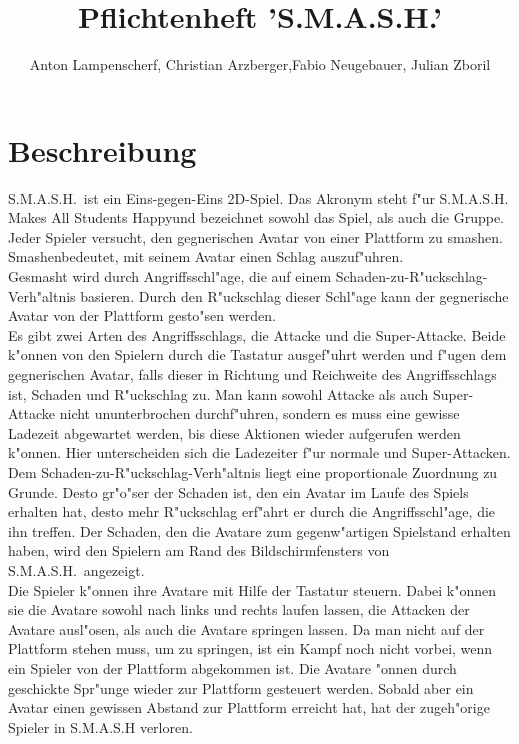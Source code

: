 \documentclass[a4paper, 11pt]{article}
\title{Pflichtenheft 'S.M.A.S.H.'}
\author{Anton Lampenscherf, Christian Arzberger,\newline  Fabio Neugebauer, Julian Zboril}
\begin{document}
    \maketitle

    \section{Beschreibung}\label{sec:beschreibung}
    S.M.A.S.H.\ ist ein Eins-gegen-Eins 2D-Spiel.
    Das Akronym steht f"ur \newline\glqq S.M.A.S.H. Makes All Students Happy\grqq\space und bezeichnet sowohl das Spiel, als auch die Gruppe.
    Jeder Spieler versucht, den gegnerischen Avatar von einer Plattform zu \glqq smashen\grqq. \glqq Smashen\grqq bedeutet, mit seinem Avatar einen Schlag auszuf"uhren.\\

    \noindent
    Gesmasht wird durch Angriffsschl"age, die auf einem Schaden-zu-R"uckschlag-Verh"altnis basieren.
    Durch den R"uckschlag dieser Schl"age kann der gegnerische Avatar von der Plattform gesto"sen werden.\\

    \noindent
    Es gibt zwei Arten des Angriffsschlags, die Attacke und die Super-Attacke.
    Beide k"onnen von den Spielern durch die Tastatur ausgef"uhrt werden und f"ugen dem gegnerischen Avatar, falls dieser in Richtung und Reichweite des Angriffsschlags ist, Schaden und R"uckschlag zu.
    Man kann sowohl Attacke als auch Super-Attacke nicht ununterbrochen durchf"uhren, sondern es muss eine gewisse Ladezeit abgewartet werden, bis diese Aktionen wieder aufgerufen werden k"onnen.
    Hier unterscheiden sich die Ladezeiter f"ur normale und Super-Attacken.\\

    \noindent
    Dem Schaden-zu-R"uckschlag-Verh"altnis liegt eine proportionale Zuordnung zu Grunde.
    Desto gr"o"ser der Schaden ist, den ein Avatar im Laufe des Spiels erhalten hat, desto mehr R"uckschlag erf"ahrt er durch die Angriffsschl"age, die ihn treffen.
    Der Schaden, den die Avatare zum gegenw"artigen Spielstand erhalten haben, wird den Spielern am Rand des Bildschirmfensters von S.M.A.S.H.\ angezeigt.\\

    \noindent
    Die Spieler k"onnen ihre Avatare mit Hilfe der Tastatur steuern.
    Dabei k"onnen sie die Avatare sowohl nach links und rechts laufen lassen, die Attacken der Avatare ausl"osen, als auch die Avatare springen lassen.
    Da man nicht auf der Plattform stehen muss, um zu springen, ist ein Kampf noch nicht vorbei, wenn ein Spieler von der Plattform abgekommen ist.
    Die Avatare "onnen durch geschickte Spr"unge wieder zur Plattform gesteuert werden.
    Sobald aber ein Avatar einen gewissen Abstand zur Plattform erreicht hat, hat der zugeh"orige Spieler in S.M.A.S.H verloren.\\
\end{document}
